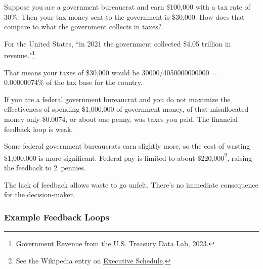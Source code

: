 \begin{mdframed}[frametitle={Taxes and Spending},frametitlerule=true,frametitlealignment=\centering]
Suppose you are a government bureaucrat and earn \$100,000 with a tax rate of 30\%. Then your tax money sent to the government is \$30,000.
How does that compare to what the government collects in taxes?

For the United States, ``in 2021 the government collected \$4.05 trillion in revenue."\footnote{Government Revenue from the \href{https://datalab.usaspending.gov/americas-finance-guide/revenue/}{U.S. Treasury Data Lab}, 2023.}

That means your taxes of \$30,000 would be
30000/4050000000000 = 0.00000074\% of the tax base for the country.

If you are a federal government bureaucrat and you do not maximize the effectiveness of spending \$1,000,000 of government money, of that misallocated money only \$0.0074, or about one penny, was taxes you paid. The financial feedback loop is weak.

Some federal government bureaucrats earn slightly more, so the cost of wasting \$1,000,000 is more significant.
Federal pay is limited to about \$220,000\footnote{See the Wikipedia entry on \href{https://en.wikipedia.org/wiki/Executive_Schedule}{Executive Schedule}.
}, raising the feedback to 2~pennies.
\end{mdframed}

The lack of feedback allows waste to go unfelt. There's no immediate consequence for the decision-maker.



\subsubsection{Example Feedback Loops}



